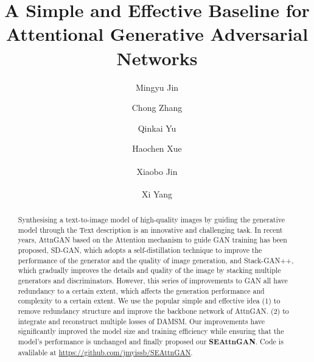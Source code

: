 \documentclass[runningheads, orivec]{llncs}
\begin{document}
\title{A Simple and Effective Baseline for Attentional Generative Adversarial Networks}
    

\author{
Mingyu Jin\and 
Chong Zhang\and
Qinkai Yu \and
Haochen Xue \and
Xiaobo Jin\textsuperscript{\Letter} \and
Xi Yang\textsuperscript{\Letter}
}
\vspace{-10pt}

\maketitle  %
\vspace{-15pt}

\begin{abstract}
Synthesising a text-to-image model of high-quality images by guiding the generative model through the Text description is an innovative and challenging task. In recent years, AttnGAN based on the Attention mechanism to guide GAN training has been proposed, SD-GAN, which adopts a self-distillation technique to improve the performance of the generator and the quality of image generation, and Stack-GAN++, which gradually improves the details and quality of the image by stacking multiple generators and discriminators. However, this series of improvements to GAN all have redundancy to a certain extent, which affects the generation performance and complexity to a certain extent. We use the popular simple and effective idea (1) to remove redundancy structure and improve the backbone network of AttnGAN. (2) to integrate and reconstruct multiple losses of DAMSM. Our improvements have significantly improved the model size and training efficiency while ensuring that the model's performance is unchanged and finally proposed our \textbf{SEAttnGAN}. Code is avalilable at \href{https://github.com/jmyissb/SEAttnGAN}{https://github.com/jmyissb/SEAttnGAN}.

\end{abstract}
\end{document}
